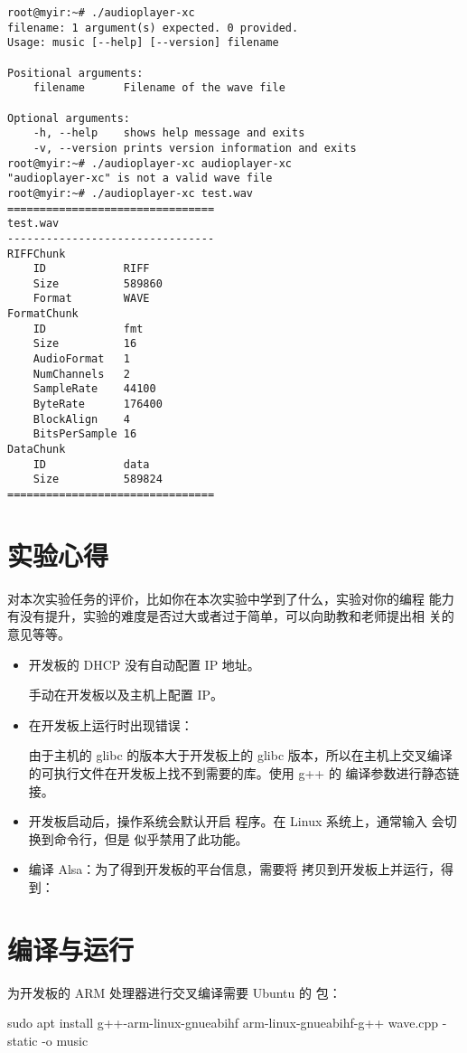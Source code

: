 \begin{verbatim}
root@myir:~# ./audioplayer-xc 
filename: 1 argument(s) expected. 0 provided.
Usage: music [--help] [--version] filename

Positional arguments:
    filename      Filename of the wave file

Optional arguments:
    -h, --help    shows help message and exits
    -v, --version prints version information and exits
root@myir:~# ./audioplayer-xc audioplayer-xc 
"audioplayer-xc" is not a valid wave file
root@myir:~# ./audioplayer-xc test.wav 
================================
test.wav
--------------------------------
RIFFChunk
    ID            RIFF
    Size          589860
    Format        WAVE
FormatChunk
    ID            fmt
    Size          16
    AudioFormat   1
    NumChannels   2
    SampleRate    44100
    ByteRate      176400
    BlockAlign    4
    BitsPerSample 16
DataChunk
    ID            data
    Size          589824
================================
\end{verbatim}

\section{实验心得}

对本次实验任务的评价，比如你在本次实验中学到了什么，实验对你的编程
能力有没有提升，实验的难度是否过大或者过于简单，可以向助教和老师提出相
关的意见等等。



\begin{itemize}
    \item 开发板的 DHCP 没有自动配置 IP 地址。
    
    手动在开发板以及主机上配置 IP。

    \item 在开发板上运行时出现错误：
    
    
    由于主机的 glibc 的版本大于开发板上的 glibc 版本，所以在主机上交叉编译的可执行文件在开发板上找不到需要的库。使用 g++ 的  编译参数进行静态链接。

    \item 开发板启动后，操作系统会默认开启  程序。在 Linux 系统上，通常输入  会切换到命令行，但是  似乎禁用了此功能。
    

    \item 编译 Alsa：为了得到开发板的平台信息，需要将  拷贝到开发板上并运行，得到：
\end{itemize}

\section{编译与运行}

为开发板的 ARM 处理器进行交叉编译需要 Ubuntu 的  包：

\begin{codeblock}
sudo apt install g++-arm-linux-gnueabihf
arm-linux-gnueabihf-g++ wave.cpp -static -o music
\end{codeblock}
